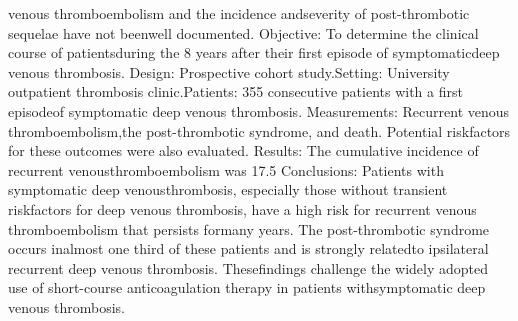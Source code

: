 venous  thromboembolism  and  the  incidence  andseverity  of  post-thrombotic  sequelae  have  not  beenwell documented.
Objective: To determine the clinical course of patientsduring the 8 years after their first episode of symptomaticdeep  venous  thrombosis.
Design: Prospective cohort study.Setting: University outpatient thrombosis clinic.Patients: 355 consecutive patients with a first episodeof symptomatic deep venous thrombosis.
Measurements:  Recurrent  venous  thromboembolism,the post-thrombotic syndrome, and death. Potential riskfactors for these outcomes were also evaluated.
Results: The cumulative incidence of recurrent venousthromboembolism was 17.5%
Conclusions: Patients with symptomatic deep venousthrombosis,  especially  those  without  transient  riskfactors for deep venous thrombosis, have a high risk for recurrent venous thromboembolism that persists formany years. The post-thrombotic syndrome occurs inalmost one third of these patients and is strongly relatedto ipsilateral recurrent deep venous thrombosis. Thesefindings  challenge  the  widely  adopted  use  of  short-course  anticoagulation  therapy  in  patients  withsymptomatic deep venous thrombosis.

